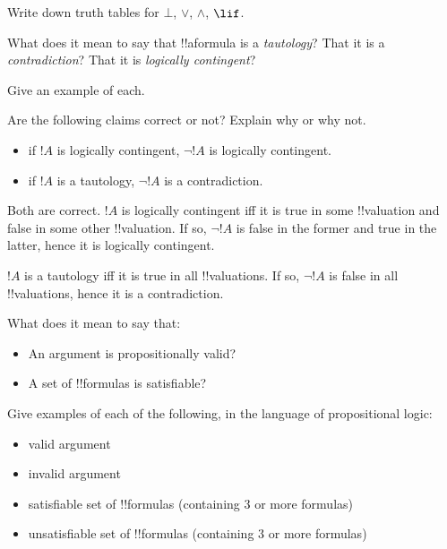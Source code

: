 \documentclass[../../../include/open-logic-section]{subfiles}
\begin{document}


\begin{prob}
    Write down truth tables for $\bot$, $\lor$, $\land$, $\lif$.
\end{prob}

\begin{prob}
    What does it mean to say that !!a{formula} is a \emph{tautology}?
    That it is a \emph{contradiction}? That it is \emph{logically contingent}?

    Give an example of each.
\end{prob}

\begin{prob}
    Are the following claims correct or not? Explain why or why not.
    \begin{itemize}
    \item if $!A$ is logically contingent, $\lnot !A$ is logically contingent.
    \item if $!A$ is a tautology, $\lnot !A$ is a contradiction.
    \end{itemize}

    \begin{ans}
    Both are correct. $!A$ is logically contingent iff it is true in some
    !!{valuation} and false in some other !!{valuation}. If so, $\lnot!A$ is
    false in the former and true in the latter, hence it is logically
    contingent.

    $!A$ is a tautology iff it is true in all !!{valuation}s. If so, 
    $\lnot !A$ is false in all !!{valuation}s, hence it is a contradiction.
    \end{ans}
\end{prob}

\begin{prob}
    What does it mean to say that:
    \begin{itemize}
    \item An argument is propositionally valid?
    \item A set of !!{formula}s is satisfiable?
    \end{itemize}

    Give examples of each of the following, in the language of
    propositional logic:
    \begin{itemize}
    \item valid argument
    \item invalid argument
    \item satisfiable set of !!{formula}s (containing 3 or more
    formulas)
    \item unsatisfiable set of !!{formula}s (containing 3 or more
    formulas)
    \end{itemize}
\end{prob}
\end{document}
